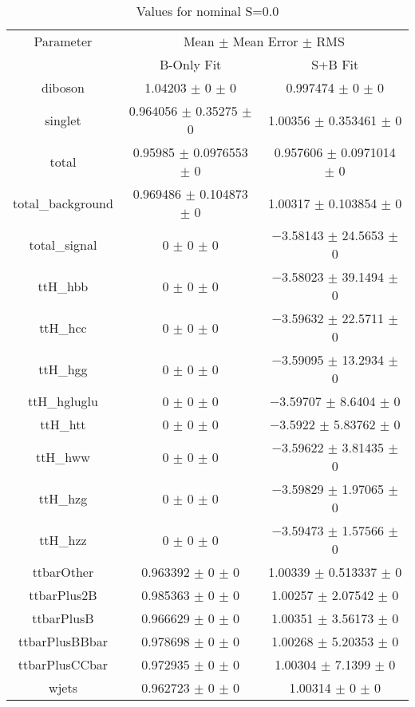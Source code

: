 \begin{table}
\centering
\caption{Values for nominal S=0.0}
\begin{tabular}{ccc}
\toprule
Parameter & \multicolumn{2}{c}{Mean $\pm$ Mean Error $\pm$ RMS}\\
 & B-Only Fit & S+B Fit\\
\midrule
diboson & \num{1.04203} $\pm$ \num{0} $\pm$ \num{0} & \num{0.997474} $\pm$ \num{0} $\pm$ \num{0}\\
singlet & \num{0.964056} $\pm$ \num{0.35275} $\pm$ \num{0} & \num{1.00356} $\pm$ \num{0.353461} $\pm$ \num{0}\\
total & \num{0.95985} $\pm$ \num{0.0976553} $\pm$ \num{0} & \num{0.957606} $\pm$ \num{0.0971014} $\pm$ \num{0}\\
total\_background & \num{0.969486} $\pm$ \num{0.104873} $\pm$ \num{0} & \num{1.00317} $\pm$ \num{0.103854} $\pm$ \num{0}\\
total\_signal & \num{0} $\pm$ \num{0} $\pm$ \num{0} & \num{-3.58143} $\pm$ \num{24.5653} $\pm$ \num{0}\\
ttH\_hbb & \num{0} $\pm$ \num{0} $\pm$ \num{0} & \num{-3.58023} $\pm$ \num{39.1494} $\pm$ \num{0}\\
ttH\_hcc & \num{0} $\pm$ \num{0} $\pm$ \num{0} & \num{-3.59632} $\pm$ \num{22.5711} $\pm$ \num{0}\\
ttH\_hgg & \num{0} $\pm$ \num{0} $\pm$ \num{0} & \num{-3.59095} $\pm$ \num{13.2934} $\pm$ \num{0}\\
ttH\_hgluglu & \num{0} $\pm$ \num{0} $\pm$ \num{0} & \num{-3.59707} $\pm$ \num{8.6404} $\pm$ \num{0}\\
ttH\_htt & \num{0} $\pm$ \num{0} $\pm$ \num{0} & \num{-3.5922} $\pm$ \num{5.83762} $\pm$ \num{0}\\
ttH\_hww & \num{0} $\pm$ \num{0} $\pm$ \num{0} & \num{-3.59622} $\pm$ \num{3.81435} $\pm$ \num{0}\\
ttH\_hzg & \num{0} $\pm$ \num{0} $\pm$ \num{0} & \num{-3.59829} $\pm$ \num{1.97065} $\pm$ \num{0}\\
ttH\_hzz & \num{0} $\pm$ \num{0} $\pm$ \num{0} & \num{-3.59473} $\pm$ \num{1.57566} $\pm$ \num{0}\\
ttbarOther & \num{0.963392} $\pm$ \num{0} $\pm$ \num{0} & \num{1.00339} $\pm$ \num{0.513337} $\pm$ \num{0}\\
ttbarPlus2B & \num{0.985363} $\pm$ \num{0} $\pm$ \num{0} & \num{1.00257} $\pm$ \num{2.07542} $\pm$ \num{0}\\
ttbarPlusB & \num{0.966629} $\pm$ \num{0} $\pm$ \num{0} & \num{1.00351} $\pm$ \num{3.56173} $\pm$ \num{0}\\
ttbarPlusBBbar & \num{0.978698} $\pm$ \num{0} $\pm$ \num{0} & \num{1.00268} $\pm$ \num{5.20353} $\pm$ \num{0}\\
ttbarPlusCCbar & \num{0.972935} $\pm$ \num{0} $\pm$ \num{0} & \num{1.00304} $\pm$ \num{7.1399} $\pm$ \num{0}\\
wjets & \num{0.962723} $\pm$ \num{0} $\pm$ \num{0} & \num{1.00314} $\pm$ \num{0} $\pm$ \num{0}\\
\bottomrule
\end{tabular}
\end{table}